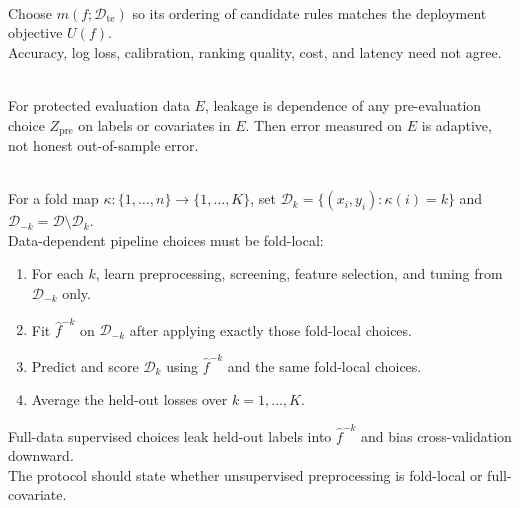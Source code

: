\begin{remark} \label{rem:sl-metric-choice} \\
Choose $m(f;\mathcal{D}_{\mathrm{te}})$ so its ordering of candidate rules matches the deployment objective $U(f)$.\\
Accuracy, log loss, calibration, ranking quality, cost, and latency need not agree.
\end{remark}

\begin{remark} \label{rem:sl-data-leakage} \\
For protected evaluation data $E$, leakage is dependence of any pre-evaluation choice $Z_{\mathrm{pre}}$ on labels or covariates in $E$. Then error measured on $E$ is adaptive, not honest out-of-sample error.
\end{remark}

\begin{method} \label{meth:sl-cross-validation-with-screening} \\
For a fold map $\kappa:\{1,\ldots,n\}\to\{1,\ldots,K\}$, set $\mathcal{D}_k=\{(x_i,y_i):\kappa(i)=k\}$ and $\mathcal{D}_{-k}=\mathcal{D}\setminus\mathcal{D}_k$.\\
Data-dependent pipeline choices must be fold-local:
\begin{enumerate}[label=(\roman*)]
\setlength{\itemsep}{0pt}
\item For each $k$, learn preprocessing, screening, feature selection, and tuning from $\mathcal{D}_{-k}$ only.
\item Fit $\widehat f^{-k}$ on $\mathcal{D}_{-k}$ after applying exactly those fold-local choices.
\item Predict and score $\mathcal{D}_k$ using $\widehat f^{-k}$ and the same fold-local choices.
\item Average the held-out losses over $k=1,\ldots,K$.
\end{enumerate}
Full-data supervised choices leak held-out labels into $\widehat f^{-k}$ and bias cross-validation downward.\\
The protocol should state whether unsupervised preprocessing is fold-local or full-covariate.
\end{method}

